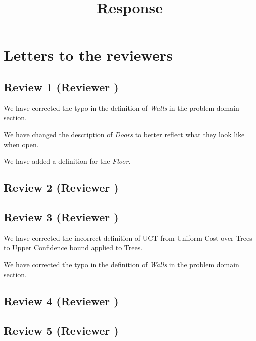 \documentclass{article}
\title{Response}
\begin{document}
\maketitle
\section{Letters to the reviewers}
\subsection{Review 1 (Reviewer )}
We have corrected the typo in the definition of \emph{Walls} in the problem domain section.

We have changed the description of \emph{Doors} to better reflect what they look like when open.

We have added a definition for the \emph{Floor}.
\subsection{Review 2 (Reviewer )}
\subsection{Review 3 (Reviewer )}
We have corrected the incorrect definition of UCT from Uniform Cost over Trees to Upper Confidence bound applied to Trees.

We have corrected the typo in the definition of \emph{Walls} in the problem domain section.
\subsection{Review 4 (Reviewer )}
\subsection{Review 5 (Reviewer )}
\end{document}
